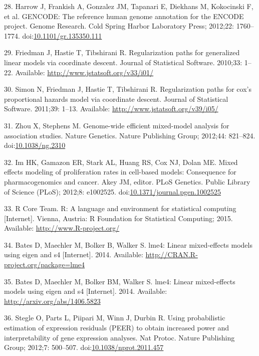 \documentclass[]{article}
\begin{document}
28. Harrow J, Frankish A, Gonzalez JM, Tapanari E, Diekhans M,
Kokocinski F, et al. GENCODE: The reference human genome annotation for
the ENCODE project. Genome Research. Cold Spring Harbor Laboratory
Press; 2012;22: 1760--1774.
doi:\href{http://dx.doi.org/10.1101/gr.135350.111}{10.1101/gr.135350.111}

29. Friedman J, Hastie T, Tibshirani R. Regularization paths for
generalized linear models via coordinate descent. Journal of Statistical
Software. 2010;33: 1--22. Available:
\url{http://www.jstatsoft.org/v33/i01/}

30. Simon N, Friedman J, Hastie T, Tibshirani R. Regularization paths
for cox's proportional hazards model via coordinate descent. Journal of
Statistical Software. 2011;39: 1--13. Available:
\url{http://www.jstatsoft.org/v39/i05/}

31. Zhou X, Stephens M. Genome-wide efficient mixed-model analysis for
association studies. Nature Genetics. Nature Publishing Group; 2012;44:
821--824. doi:\href{http://dx.doi.org/10.1038/ng.2310}{10.1038/ng.2310}

32. Im HK, Gamazon ER, Stark AL, Huang RS, Cox NJ, Dolan ME. Mixed
effects modeling of proliferation rates in cell-based models:
Consequence for pharmacogenomics and cancer. Akey JM, editor. PLoS
Genetics. Public Library of Science (PLoS); 2012;8: e1002525.
doi:\href{http://dx.doi.org/10.1371/journal.pgen.1002525}{10.1371/journal.pgen.1002525}

33. R Core Team. R: A language and environment for statistical computing
{[}Internet{]}. Vienna, Austria: R Foundation for Statistical Computing;
2015. Available: \url{http://www.R-project.org/}

34. Bates D, Maechler M, Bolker B, Walker S. lme4: Linear mixed-effects
models using eigen and s4 {[}Internet{]}. 2014. Available:
\url{http://CRAN.R-project.org/package=lme4}

35. Bates D, Maechler M, Bolker BM, Walker S. lme4: Linear mixed-effects
models using eigen and s4 {[}Internet{]}. 2014. Available:
\url{http://arxiv.org/abs/1406.5823}

36. Stegle O, Parts L, Piipari M, Winn J, Durbin R. Using probabilistic
estimation of expression residuals (PEER) to obtain increased power and
interpretability of gene expression analyses. Nat Protoc. Nature
Publishing Group; 2012;7: 500--507.
doi:\href{http://dx.doi.org/10.1038/nprot.2011.457}{10.1038/nprot.2011.457}
\end{document}
